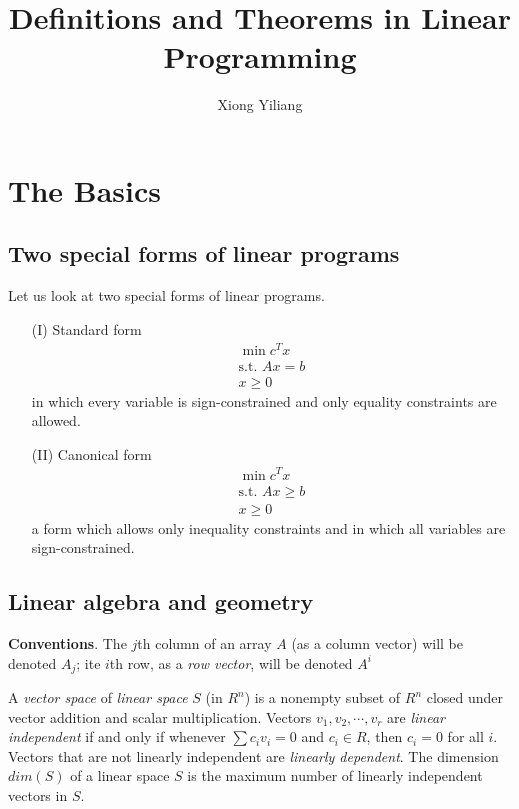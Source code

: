 \documentclass[11pt]{article} %
\title{Definitions and Theorems in Linear Programming}
\author{Xiong Yiliang}
\date{} %
\theoremstyle{plain}%
\theoremstyle{definition}
\theoremstyle{remark}
\begin{document}
\maketitle

\section{The Basics}

\subsection{Two special forms of linear programs}

Let us look at two special forms of linear programs. 

\begin{itemize}
\item[(I) Standard form] 
\begin{align*}
\min c^T x \\
\text{s.t. } Ax = b\\
x \geq 0
\end{align*}
in which every variable is sign-constrained and only equality constraints are allowed. 
\item[(II) Canonical form]
\begin{align*}
\min c^T x\\
\text{s.t. } Ax \geq b\\
x \geq 0
\end{align*}
a form which allows only inequality constraints and in which all variables are
sign-constrained. 
\end{itemize}

\subsection{Linear algebra and geometry}
\textbf{Conventions}. The $j$th column of an array $A$ (as a column vector) will 
be denoted $A_j$; ite $i$th row, as a \emph{row vector}, will be denoted $A^i$

A \emph{vector space} of \emph{linear space} $S$ (in $R^n$) is a nonempty 
subset of $R^n$ closed under vector addition and scalar multiplication. Vectors 
$v_1, v_2, \cdots, v_r$ are \emph{linear independent} if and only if whenever
$\sum c_i v_i = 0$ and $c_i \in R$, then $c_i = 0$ for all $i$. Vectors that are
not linearly independent are \emph{linearly dependent}. The dimension $dim(S)$ 
of a linear space $S$ is the maximum number of linearly independent vectors in $S$. 
\end{document}
